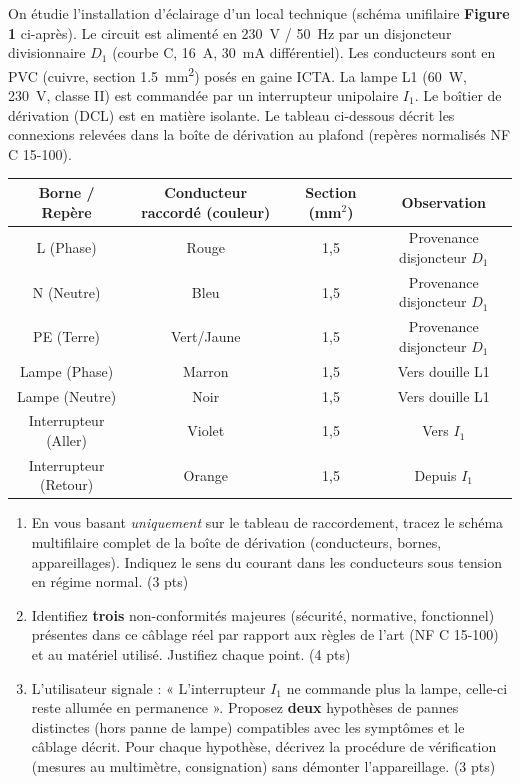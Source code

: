 \documentclass[11pt]{article}
\begin{document}
\begin{exercice}
On étudie l'installation d'éclairage d'un local technique (schéma unifilaire \textbf{Figure 1} ci-après). Le circuit est alimenté en \SI{230}{V} / \SI{50}{Hz} par un disjoncteur divisionnaire $D_1$ (courbe C, \SI{16}{A}, \SI{30}{mA} différentiel). Les conducteurs sont en PVC (cuivre, section \SI{1,5}{mm^2}) posés en gaine ICTA. La lampe L1 (\SI{60}{W}, \SI{230}{V}, classe II) est commandée par un interrupteur unipolaire $I_1$. Le boîtier de dérivation (DCL) est en matière isolante. Le tableau ci-dessous décrit les connexions relevées dans la boîte de dérivation au plafond (repères normalisés NF C 15-100).

\begin{tabular}{|c|c|c|c|}
\hline
\textbf{Borne / Repère} & \textbf{Conducteur raccordé (couleur)} & \textbf{Section (mm$^2$)} & \textbf{Observation} \\
\hline
L (Phase) & Rouge & 1,5 & Provenance disjoncteur $D_1$ \\
\hline
N (Neutre) & Bleu & 1,5 & Provenance disjoncteur $D_1$ \\
\hline
PE (Terre) & Vert/Jaune & 1,5 & Provenance disjoncteur $D_1$ \\
\hline
Lampe (Phase) & Marron & 1,5 & Vers douille L1 \\
\hline
Lampe (Neutre) & Noir & 1,5 & Vers douille L1 \\
\hline
Interrupteur (Aller) & Violet & 1,5 & Vers $I_1$ \\
\hline
Interrupteur (Retour) & Orange & 1,5 & Depuis $I_1$ \\
\hline
\end{tabular}

\begin{enumerate}
\item En vous basant \textit{uniquement} sur le tableau de raccordement, tracez le schéma multifilaire complet de la boîte de dérivation (conducteurs, bornes, appareillages). Indiquez le sens du courant dans les conducteurs sous tension en régime normal. (3 pts)
\item Identifiez \textbf{trois} non-conformités majeures (sécurité, normative, fonctionnel) présentes dans ce câblage réel par rapport aux règles de l'art (NF C 15-100) et au matériel utilisé. Justifiez chaque point. (4 pts)
\item L'utilisateur signale : « L'interrupteur $I_1$ ne commande plus la lampe, celle-ci reste allumée en permanence ». Proposez \textbf{deux} hypothèses de pannes distinctes (hors panne de lampe) compatibles avec les symptômes et le câblage décrit. Pour chaque hypothèse, décrivez la procédure de vérification (mesures au multimètre, consignation) sans démonter l'appareillage. (3 pts)
\end{enumerate}
\end{exercice}
\end{document}
